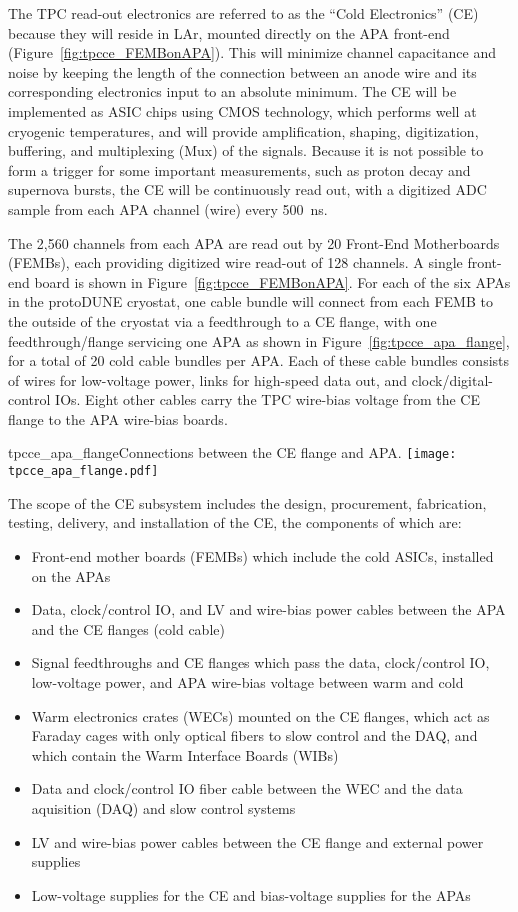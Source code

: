 The TPC read-out electronics are referred to as the ``Cold Electronics'' (CE) because they will reside in LAr,
mounted directly on the APA front-end (Figure~\ref{fig:tpcce_FEMBonAPA}).
This will minimize channel capacitance and noise by keeping the length of the connection between an anode wire
and its corresponding electronics input to an absolute minimum.
The CE will be implemented as ASIC chips using CMOS technology,
which performs well at cryogenic temperatures,
and will provide amplification, shaping, digitization, buffering, and multiplexing (Mux) of the signals.
Because it is not possible to form a trigger for some important measurements,
such as proton decay and supernova bursts, the CE will be continuously read out,
with a digitized ADC sample from each APA channel (wire) every 500~ns.

The 2,560 channels from each APA are read out by 20 Front-End Motherboards (FEMBs), each providing 
digitized wire read-out of 128 channels. A single front-end board is shown in Figure~\ref{fig:tpcce_FEMBonAPA}.
For each of the six APAs in the protoDUNE cryostat, one cable bundle will 
connect from each FEMB to the outside of the cryostat via a feedthrough to a CE flange, with one 
feedthrough/flange servicing one APA as shown in Figure~\ref{fig:tpcce_apa_flange},
for a total of 20 cold cable bundles per APA. 
Each of these cable bundles consists of wires for low-voltage power, links for high-speed data out,
and clock/digital-control IOs.
Eight other cables carry the TPC wire-bias voltage from the CE flange to the APA wire-bias boards.

\begin{cdrfigure}{tpcce_apa_flange}{Connections between
the CE flange and APA.}
\texttt{[image: tpcce\_apa\_flange.pdf]}
\end{cdrfigure}

The scope of the CE subsystem includes the design, procurement, fabrication, testing,
delivery, and installation of the CE, the components of which are:
\begin{itemize}
\item Front-end mother boards (FEMBs) which include the cold ASICs, installed on the APAs
\item Data, clock/control IO, and LV and wire-bias power cables 
between the APA and the CE flanges (cold cable)
\item Signal feedthroughs and CE flanges which pass the data, clock/control IO, 
low-voltage power, and APA wire-bias voltage between warm and cold
\item Warm electronics crates (WECs) mounted on the CE flanges, which act as Faraday cages with
only optical fibers to slow control and the DAQ, and which contain the Warm Interface Boards (WIBs)
\item Data and clock/control IO fiber cable between the WEC and the data aquisition 
(DAQ) and slow control systems
\item LV and wire-bias power cables between the CE flange and external power supplies
\item Low-voltage supplies for the CE and bias-voltage supplies for the APAs
\end{itemize}

